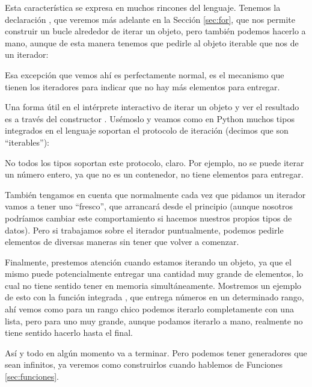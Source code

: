 Esta característica se expresa en muchos rincones del lenguaje. Tenemos la declaración , que veremos más adelante en la Sección \ref{sec:for}, que nos permite construir un bucle alrededor de iterar un objeto, pero también podemos hacerlo a mano, aunque de esta manera tenemos que pedirle al objeto iterable que nos de un iterador:


Esa excepción que vemos ahí es perfectamente normal, es el mecanismo que tienen los iteradores para indicar que no hay más elementos para entregar.

Una forma útil en el intérprete interactivo de iterar un objeto y ver el resultado es a través del constructor . Usémoslo y veamos como en Python muchos tipos integrados en el lenguaje soportan el protocolo de iteración (decimos que son ``iterables''):


No todos los tipos soportan este protocolo, claro. Por ejemplo, no se puede iterar un número entero, ya que no es un contenedor, no tiene elementos para entregar.

También tengamos en cuenta que normalmente cada vez que pidamos un iterador vamos a tener uno ``fresco'', que arrancará desde el principio (aunque nosotros podríamos cambiar este comportamiento si hacemos nuestros propios tipos de datos). Pero si trabajamos sobre el iterador puntualmente, podemos pedirle elementos de diversas maneras sin tener que volver a comenzar.


Finalmente, prestemos atención cuando estamos iterando un objeto, ya que el mismo puede potencialmente entregar una cantidad muy grande de elementos, lo cual no tiene sentido tener en memoria simultáneamente. Mostremos un ejemplo de esto con la función integrada , que entrega números en un determinado rango, ahí vemos como para un rango chico podemos iterarlo completamente con una lista, pero para uno muy grande, aunque podamos iterarlo a mano, realmente no tiene sentido hacerlo hasta el final.


Así y todo  en algún momento va a terminar. Pero podemos tener generadores que sean infinitos, ya veremos como construirlos cuando hablemos de Funciones \ref{sec:funciones}.
